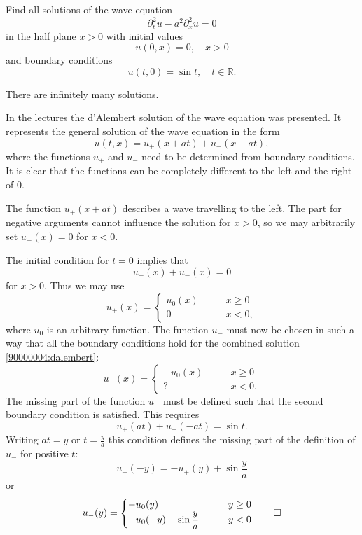 Find all solutions of the wave equation
\[
\partial_t^2u-a^2\partial_x^2u=0
\]
in the half plane $x>0$ with initial values
\[
u(0,x)=0,\quad x>0
\]
and boundary conditions
\[
u(t,0)=\sin t,\quad t\in\mathbb R.
\]

\begin{hinweis}
There are infinitely many solutions.
\end{hinweis}

\begin{loesung}
In the lectures the d'Alembert solution of the wave equation was
presented.
It represents the general solution of the wave equation in the form
\begin{equation}
u(t,x)
=
u_+(x+at)+u_-(x-at),
\label{90000004:dalembert}
\end{equation}
where the functions $u_+$ and $u_-$
need to be determined from boundary conditions.
It is clear that the functions can be completely different to the left
and the right of $0$.

The function $u_+(x+at)$ describes a wave travelling to the left.
The part for negative arguments cannot influence the solution for $x>0$,
so we may arbitrarily set $u_+(x)=0$ for $x<0$.

The initial condition for $t=0$ implies that
\[
u_+(x)+u_-(x)=0
\]
for $x>0$.
Thus we may use
\[
u_+(x)=\begin{cases}u_0(x)&\qquad x\ge 0\\
0&\qquad x<0,
\end{cases}
\]
where $u_0$ is an arbitrary function.
The function $u_-$ must now be chosen in such a way that 
all the boundary conditions hold for the 
combined solution \eqref{90000004:dalembert}:
\[
u_-(x)=\begin{cases}
-u_0(x)&\qquad x\ge 0\\
?&\qquad x<0.
\end{cases}
\]
The missing part of the function $u_-$ must be defined such that the
second boundary condition is satisfied.
This requires
\[
u_+(at)+u_-(-at)=\sin t.
\]
Writing 
$at=y$ or $t=\frac{y}{a}$
this condition defines the missing part of the definition of $u_-$
for positive $t$:
\[
u_-(-y)=-u_+(y)+\sin \frac{y}{a}
\]
or
\[
u_-(y)=\begin{cases}
-u_0(y)&\qquad y\ge 0\\
-u_0(-y)-\sin{\displaystyle\frac{y}{a}}&\qquad y<0
\end{cases}
\qedhere
\]
\end{loesung}
